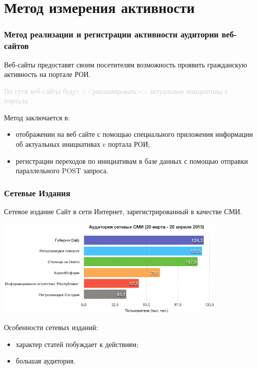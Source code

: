\documentclass{beamer}
\begin{document}
\section{Метод измерения активности}
\begin{frame}
\frametitle{Метод реализации и регистрации активности аудитории веб-сайтов}
Веб-сайты предоставят своим посетителям возможность проявить гражданскую активность на портале РОИ.

\textcolor{lightgray}{По сути веб-сайты будут <<рекламировать>> актуальные инициативы с портала.}

\vspace{0.5cm}
Метод заключается в:
\begin{itemize}
  \item отображении на веб сайте с помощью специального приложения информации об актуальных инициативах c портала РОИ;
  \item регистрации переходов по инициативам в базе данных с помощью отправки параллельного POST запроса.
\end{itemize}

\end{frame}

\begin{frame}
\frametitle{Сетевые Издания}
\begin{block}{Сетевое издание}
Сайт в сети Интернет, зарегистрированный в качестве СМИ.
\end{block}
\includegraphics[width=0.84\textwidth]{images/usersSMI}

Особенности сетевых изданий:
\begin{itemize}
  \item характер статей побуждает к действиям;
  \item большая аудитория.
\end{itemize}
\end{frame}
\end{document}
